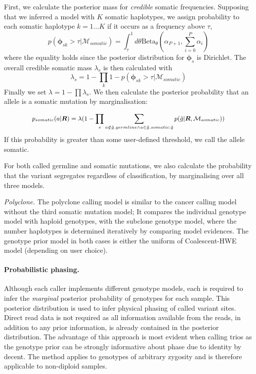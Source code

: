 \documentclass[notitlepage, twocolumn, 10pt]{article}
\begin{document}
First, we calculate the posterior mass for \emph{credible} somatic frequencies. Supposing that we inferred a model with $K$ somatic haplotypes, we assign probability to each somatic haplotype $k = 1 \dots K$ if it occurs as a frequency above $\tau$,
\begin{equation*}
p(\boldsymbol{\phi}_{sk} > \tau | \mathcal{M}_{somatic}) = \int_{\tau}^1 d\theta \text{Beta}_{\theta}(\alpha_{P + 1}, \sum_{i = 0}^{P} \alpha_i)
\end{equation*}
where the equality holds since the posterior distribution for $\boldsymbol{\phi}_{s}$ is Dirichlet. The overall credible somatic mass $\lambda_{s}$ is then calculated with
\begin{equation*}
\lambda_{s} = 1 - \prod_k 1 - p(\boldsymbol{\phi}_{sk} > \tau | \mathcal{M}_{somatic})
\end{equation*}
Finally we set $\lambda = 1 - \prod \lambda_s$. We then calculate the posterior probability that an allele is a somatic mutation by marginalisation:

\begin{equation*}\small
p_{somatic}(a | \boldsymbol{R}) = \lambda(1 - \prod_s \sum_{a \notin \tilde{g}.germline \land a \in \tilde{g}.somatic : \tilde{g}}p(\tilde{g} | \boldsymbol{R}, \mathcal{M}_{somatic}))
\end{equation*}
If this probability is greater than some user-defined threshold, we call the allele somatic.

For both called germline and somatic mutations, we also calculate the probability that the variant segregates regardless of classification, by marginalising over all three models.

\vspace{3mm}
\noindent\emph{Polyclone.} The polyclone calling model is similar to the cancer calling model without the third somatic mutation model; It compares the individual genotype model with haploid genotypes, with the subclone genotype model, where the number haplotypes is determined iteratively by comparing model evidences. The genotype prior model in both cases is either the uniform of Coalescent-HWE model (depending on user choice).

\paragraph*{Probabilistic phasing.} Although each caller implements different genotype models, each is required to infer the \emph{marginal} posterior probability of genotypes for each sample. This posterior distribution is used to infer physical phasing of called variant sites. Direct read data is not required as all information available from the reads, in addition to any prior information, is already contained in the posterior distribution. The advantage of this approach is most evident when calling trios as the genotype prior can be strongly informative about phase due to identity by decent. The method applies to genotypes of arbitrary zygosity and is therefore applicable to non-diploid samples.
\end{document}

